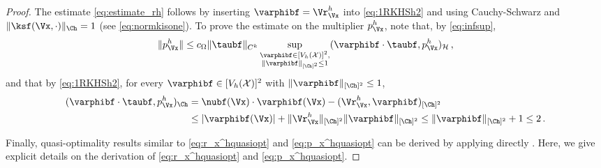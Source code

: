 \documentclass{siamart1116}
\numberwithin{theorem}{section}
\begin{document}
\begin{proof}
The estimate \cref{eq:estimate_rh} follows by inserting $\varphibf = \Vr_\Vx^h$
into \cref{eq:1RKHSh2} and using Cauchy-Schwarz and $\|\ksf(\Vx,\cdot)\|_{\Ch}=1$
(see \cref{eq:normkisone}). 
 To prove the estimate on the multiplier $p^h_\Vx$, note
that, by \cref{eq:infsup},
\begin{equation}
\Vert p^h_\Vx \Vert \leq c_\Omega\|\taubf\|_{C^k}
\sup_{\substack{\varphibf \in [V_h(\mathcal X)]^2,\\ \|\varphibf\|_{[\Ch]^2}\le 1} }
(\varphibf \cdot \taubf, p^h_\Vx )_{\mathcal  H}\,,
\end{equation}
and that by \cref{eq:1RKHSh2},
for every $\varphibf \in [V_h(\mathcal X)]^2$ with $\|\varphibf\|_{[\Ch]^2}\le 1$,
\begin{align*}
(\varphibf \cdot \taubf, p^h_\Vx)_{\Ch} 
&=\nubf(\Vx)\cdot\varphibf(\Vx)
- (\Vr^h_\Vx, \varphibf)_{[\Ch]^2}\\
&\leq\vert\varphibf(\Vx)\vert + \Vert \Vr^h_\Vx\Vert_{[\Ch]^2} \Vert \varphibf\Vert_{[\Ch]^2}
\leq \Vert \varphibf \Vert_{[\Ch]^2} + 1 \leq 2\,. 
\end{align*}

Finally, quasi-optimality results similar to \eqref{eq:r_x^hquasiopt} and
\eqref{eq:p_x^hquasiopt} can be derived by applying directly \cite[Prop. 5.2.1, pp 274]{BoBrFo13}.
Here, we give explicit details on the derivation of \eqref{eq:r_x^hquasiopt} and \eqref{eq:p_x^hquasiopt}.


\end{proof}
\end{document}
